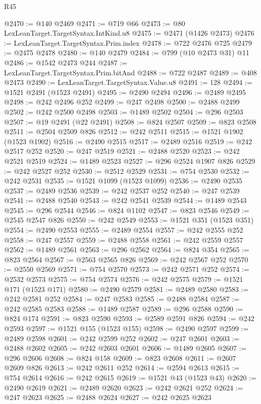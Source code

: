 \begin{lexlean}{R45}
\begin{coremodule}
{@2470 := @140 @2469
@2471 := @719 @66
@2473 := @80 LexLeanTarget.TargetSyntax.IntKind.u8
@2475 := @2471 (@1426 @2473)
@2476 := LexLeanTarget.TargetSyntax.Prim.index
@2478 := @722 @2476 @725
@2479 := @2475 @2478
@2480 := @140 @2479
@2484 := @799 (@10 @2473 @31) @11
@2486 := @1542 @2473 @244
@2487 := LexLeanTarget.TargetSyntax.Prim.bitAnd
@2488 := @722 @2487
@2489 := @408 @2473
@2490 := LexLeanTarget.TargetSyntax.Value.u8
@2491 := 128
@2494 := @1521 @2491 (@1523 @2491)
@2495 := @2490 @2494
@2496 := @2489 @2495
@2498 := @242 @2496 @252
@2499 := @247 @2498
@2500 := @2488 @2499
@2502 := @242 @2500 @2498
@2503 := @1489 @2502
@2504 := @296 @2503
@2507 := @19 @2491 (@22 @2491)
@2508 := @824 @2507
@2509 := @823 @2508
@2511 := @2504 @2509 @826
@2512 := @242 @2511
@2515 := @1521 @1902 (@1523 @1902)
@2516 := @2490 @2515
@2517 := @2489 @2516
@2519 := @242 @2517 @252
@2520 := @247 @2519
@2521 := @2488 @2520
@2523 := @242 @2521 @2519
@2524 := @1489 @2523
@2527 := @296 @2524 @1907 @826
@2529 := @242 @2527 @252
@2530 := @2512 @2529
@2531 := @754 @2530
@2532 := @242 @2531
@2535 := @1521 @1099 (@1523 @1099)
@2536 := @2490 @2535
@2537 := @2489 @2536
@2539 := @242 @2537 @252
@2540 := @247 @2539
@2541 := @2488 @2540
@2543 := @242 @2541 @2539
@2544 := @1489 @2543
@2545 := @296 @2544
@2546 := @824 @1102
@2547 := @823 @2546
@2549 := @2545 @2547 @826
@2550 := @242 @2549
@2553 := @1521 @351 (@1523 @351)
@2554 := @2490 @2553
@2555 := @2489 @2554
@2557 := @242 @2555 @252
@2558 := @247 @2557
@2559 := @2488 @2558
@2561 := @242 @2559 @2557
@2562 := @1489 @2561
@2563 := @296 @2562
@2564 := @824 @354
@2565 := @823 @2564
@2567 := @2563 @2565 @826
@2569 := @242 @2567 @252
@2570 := @2550 @2569
@2571 := @754 @2570
@2573 := @242 @2571 @252
@2574 := @2532 @2573
@2575 := @754 @2574
@2576 := @242 @2575
@2579 := @1521 @171 (@1523 @171)
@2580 := @2490 @2579
@2581 := @2489 @2580
@2583 := @242 @2581 @252
@2584 := @247 @2583
@2585 := @2488 @2584
@2587 := @242 @2585 @2583
@2588 := @1489 @2587
@2589 := @296 @2588
@2590 := @824 @174
@2591 := @823 @2590
@2593 := @2589 @2591 @826
@2594 := @242 @2593
@2597 := @1521 @155 (@1523 @155)
@2598 := @2490 @2597
@2599 := @2489 @2598
@2601 := @242 @2599 @252
@2602 := @247 @2601
@2603 := @2488 @2602
@2605 := @242 @2603 @2601
@2606 := @1489 @2605
@2607 := @296 @2606
@2608 := @824 @158
@2609 := @823 @2608
@2611 := @2607 @2609 @826
@2613 := @242 @2611 @252
@2614 := @2594 @2613
@2615 := @754 @2614
@2616 := @242 @2615
@2619 := @1521 @43 (@1523 @43)
@2620 := @2490 @2619
@2621 := @2489 @2620
@2623 := @242 @2621 @252
@2624 := @247 @2623
@2625 := @2488 @2624
@2627 := @242 @2625 @2623
}
\end{coremodule}
\end{lexlean}
